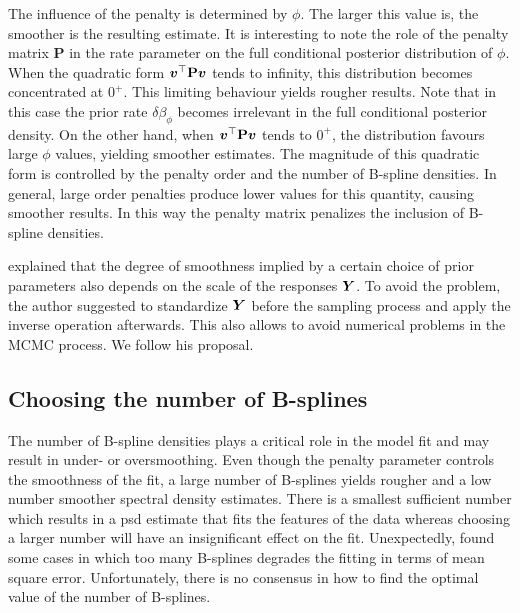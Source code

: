 \documentclass[twocolumn,final]{svjour3}
\newcommand{\bm}[1]{\mbox{\boldmath $#1$}}
\begin{document}
The influence of the penalty is determined by $\phi$.  The larger this value is, the smoother is the resulting estimate. %
It is interesting to note the role of the penalty matrix  \textbf{P} in the rate parameter on the full conditional posterior distribution of $\phi$.  When the quadratic form $\bm{v}^\top \textbf{P} \bm{v}$ tends to infinity, this distribution becomes concentrated at $0^{+}$.  This limiting behaviour yields rougher results.  Note that in this case the prior rate $\delta\beta_{\phi}$ becomes irrelevant in the full conditional posterior density.  On the other hand, when $\bm{v}^\top \textbf{P} \bm{v}$ tends to $0^{+}$, the distribution favours large $\phi$ values, yielding smoother estimates.  
%
The magnitude of this quadratic form is controlled by the penalty order and the number of B-spline densities.  In general, large order penalties produce lower values for this quantity, causing smoother results.  In this way the penalty matrix penalizes the inclusion of B-spline densities.

\cite{Ruppert2002} explained that the degree of smoothness implied by a certain choice of prior parameters also depends on the scale of the responses $\bm{Y}$.  To avoid the problem, the author suggested to standardize $\bm{Y}$ before the sampling process and apply the inverse operation afterwards.  This also allows to avoid numerical problems in the MCMC process.  We follow his proposal.

\subsection*{Choosing the number of B-splines}

The number of B-spline densities plays a critical role in the model fit and may result in under- or oversmoothing.
Even though the penalty parameter controls the smoothness of the fit, a large number of B-splines yields rougher and  a low number  smoother spectral density estimates.  There is a smallest sufficient number which results in a psd estimate that fits the features of the data whereas choosing a larger number will have an insignificant effect on the fit.   Unexpectedly, \cite{Ruppert2002} found some cases in which too many B-splines degrades the fitting in terms of mean square error.  Unfortunately, there is no  consensus in how to find the optimal value of the number of B-splines.  
\end{document}

